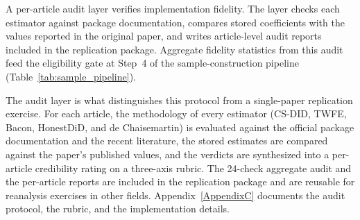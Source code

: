 A per-article audit layer verifies implementation fidelity. The layer checks each estimator against package documentation, compares stored coefficients with the values reported in the original paper, and writes article-level audit reports included in the replication package. Aggregate fidelity statistics from this audit feed the eligibility gate at Step~4 of the sample-construction pipeline (Table~\ref{tab:sample_pipeline}).

The audit layer is what distinguishes this protocol from a single-paper replication exercise. For each article, the methodology of every estimator (CS-DID, TWFE, Bacon, HonestDiD, and de Chaisemartin) is evaluated against the official package documentation and the recent literature, the stored estimates are compared against the paper's published values, and the verdicts are synthesized into a per-article credibility rating on a three-axis rubric. The 24-check aggregate audit and the per-article reports are included in the replication package and are reusable for reanalysis exercises in other fields. Appendix~\ref{AppendixC} documents the audit protocol, the rubric, and the implementation details.

